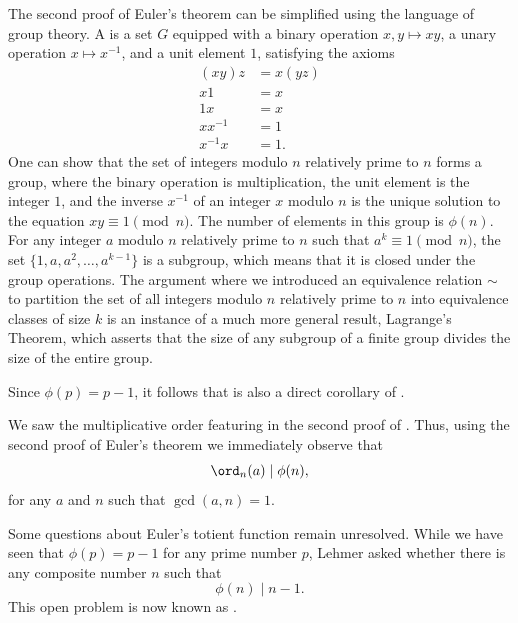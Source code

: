 \begin{remark}
  The second proof of Euler's theorem can be simplified using the language of group theory. A  is a set $G$ equipped with a binary operation $x,y\mapsto xy$, a unary operation $x\mapsto x^{-1}$, and a unit element $1$, satisfying the axioms
  \begin{align*}
    (xy)z & = x(yz) \\
    x1 & = x \\
    1x & = x \\
    xx^{-1} & = 1 \\
    x^{-1}x & = 1.
  \end{align*}
  One can show that the set of integers modulo $n$ relatively prime to $n$ forms a group, where the binary operation is multiplication, the unit element is the integer $1$, and the inverse $x^{-1}$ of an integer $x$ modulo $n$ is the unique solution to the equation $xy\equiv 1\pmod{n}$. The number of elements in this group is $\phi(n)$. For any integer $a$ modulo $n$ relatively prime to $n$ such that $a^k\equiv 1\pmod{n}$, the set $\{1,a,a^2,\ldots,a^{k-1}\}$ is a subgroup, which means that it is closed under the group operations. The argument where we introduced an equivalence relation $\sim$ to partition the set of all integers modulo $n$ relatively prime to $n$ into equivalence classes of size $k$ is an instance of a much more general result, Lagrange's Theorem, which asserts that the size of any subgroup of a finite group divides the size of the entire group.
\end{remark}

Since $\phi(p)=p-1$, it follows that  is also a direct corollary of .

\begin{remark}
  We saw the multiplicative order featuring in the second proof of . Thus, using the second proof of Euler's theorem we immediately observe that
  \begin{equation*}
    \ord_n(a)\mid \phi(n),
  \end{equation*}
  for any $a$ and $n$ such that $\gcd(a,n)=1$.
\end{remark}

Some questions about Euler's totient function remain unresolved. While we have seen that $\phi(p)=p-1$ for any prime number $p$, Lehmer asked whether there is any composite number $n$ such that
\begin{equation*}
  \phi(n)\mid n-1.
\end{equation*}
This open problem is now known as  \cite{lehmer1933}.

